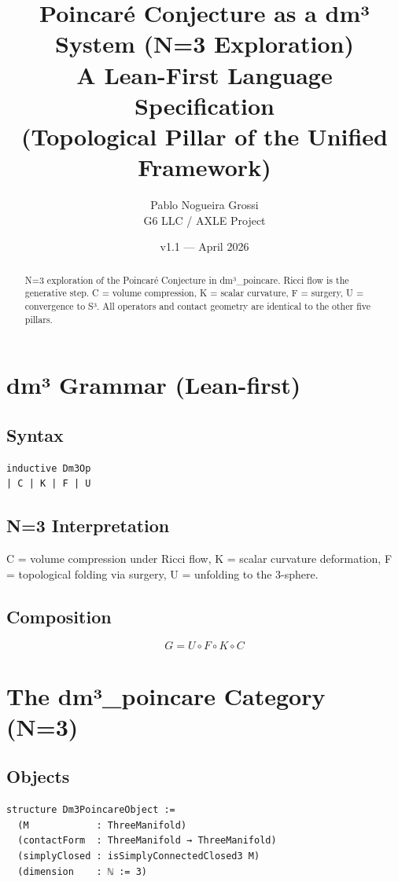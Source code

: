 \documentclass[11pt,a4paper]{article}
\title{\textbf{Poincaré Conjecture as a dm³ System (N=3 Exploration)}\\
A Lean-First Language Specification \\
(Topological Pillar of the Unified Framework)}
\author{Pablo Nogueira Grossi \\ G6 LLC / AXLE Project}
\date{v1.1 — April 2026}
\begin{document}
\maketitle

\begin{abstract}
N=3 exploration of the Poincaré Conjecture in dm³_poincare. Ricci flow is the generative step.
C = volume compression, K = scalar curvature, F = surgery, U = convergence to S³.
All operators and contact geometry are identical to the other five pillars.
\end{abstract}

\section{dm³ Grammar (Lean-first)}

\subsection{Syntax}
\begin{lstlisting}
inductive Dm3Op
| C | K | F | U
\end{lstlisting}

\subsection{N=3 Interpretation}
C = volume compression under Ricci flow,  
K = scalar curvature deformation,  
F = topological folding via surgery,  
U = unfolding to the 3-sphere.

\subsection{Composition}
\[
G = U \circ F \circ K \circ C
\]

\section{The dm³\_poincare Category (N=3)}

\subsection{Objects}
\begin{lstlisting}
structure Dm3PoincareObject :=
  (M            : ThreeManifold)
  (contactForm  : ThreeManifold → ThreeManifold)
  (simplyClosed : isSimplyConnectedClosed3 M)
  (dimension    : ℕ := 3)
\end{lstlisting}
\end{document}
